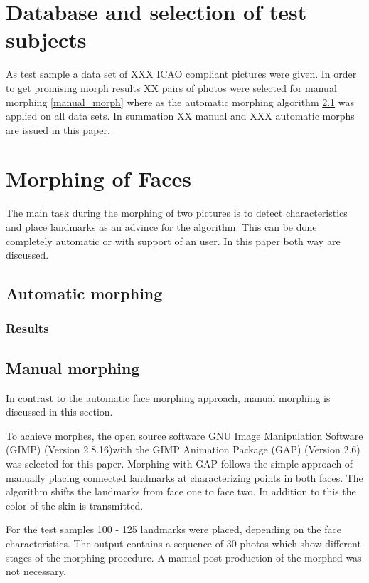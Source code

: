 \section{Database and selection of test subjects}
As test sample a data set of XXX ICAO compliant pictures were given. In order to get promising morph results XX  pairs of photos were selected for manual morphing \ref{manual_morph} where as the automatic morphing algorithm \ref{automatic_morph} was applied on all data sets. 
In summation XX manual and XXX automatic morphs are issued in this paper. 


\section{Morphing of Faces}
The main task during the morphing of two pictures is to detect characteristics and place landmarks as an advince for the algorithm. This can be done completely automatic or with support of an user. In this paper both way are discussed.  
\subsection{Automatic morphing}
\label{automatic_morph}
\subsubsection{Results}

\subsection*{Manual morphing}
\label{manual_morph}
In contrast to the automatic face morphing approach, manual morphing is discussed in this section. 

To achieve morphes, the open source software GNU Image Manipulation Software (GIMP) (Version 2.8.16)with the GIMP Animation Package (GAP) (Version 2.6) was selected for this paper. Morphing with GAP follows the simple approach of manually placing connected landmarks at characterizing points in both faces. The algorithm shifts the landmarks from face one to face two. In addition to this the color of the skin is transmitted. 

For the test samples 100 - 125 landmarks were placed, depending on the face characteristics. The output contains a sequence of 30 photos which show different stages of the morphing procedure. A manual post production of the morphed was not necessary. 

